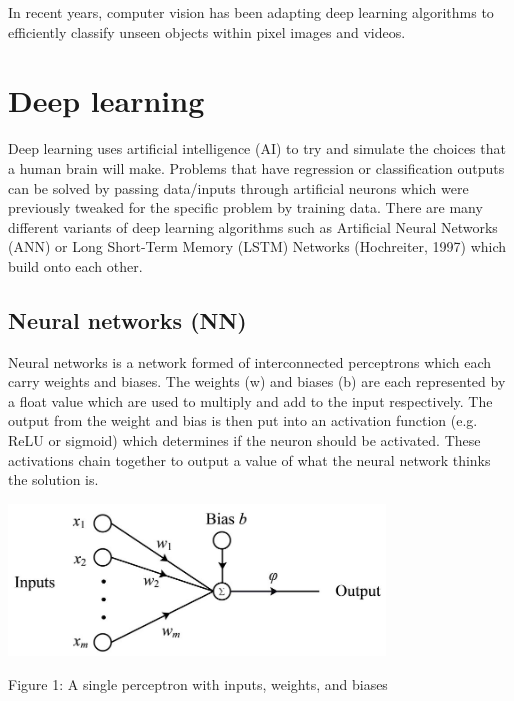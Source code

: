 \documentclass[12pt]{report}
\begin{document}
\vspace{2mm}

In recent years, computer vision has been adapting deep learning algorithms to efficiently classify unseen objects within pixel images and videos. 


\section{Deep learning}

Deep learning uses artificial intelligence (AI) to try and simulate the choices that a human brain will make. Problems that have regression or classification outputs can be solved by passing data/inputs through artificial neurons which were previously tweaked for the specific problem by training data. There are many different variants of deep learning algorithms such as Artificial Neural Networks (ANN) or Long Short-Term Memory (LSTM) Networks (Hochreiter, 1997) which build onto each other.

\subsection{Neural networks (NN)}

Neural networks is a network formed of interconnected perceptrons which each carry weights and biases. The weights (w) and biases (b) are each represented by a float value which are used to multiply and add to the input respectively. The output from the weight and bias is then put into an activation function (e.g. ReLU or sigmoid) which determines if the neuron should be activated. These activations chain together to output a value of what the neural network thinks the solution is. 

\vspace{5 mm}

\begin{centering}
	
\includegraphics[width=100mm]{./images/weights and biases.png}

{Figure 1: A single perceptron with inputs, weights, and biases}

\end{centering}
\end{document}
